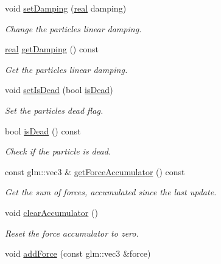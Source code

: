 \begin{DoxyCompactItemize}
void \mbox{\hyperlink{classr3_1_1_particle_a5a7d9ff7821fd5755317ec877f66e8f6}{set\+Damping}} (\mbox{\hyperlink{namespacer3_ab2016b3e3f743fb735afce242f0dc1eb}{real}} damping)
\begin{DoxyCompactList}\small\item\em Change the particle\textquotesingle{}s linear damping. \end{DoxyCompactList}\item 
\mbox{\hyperlink{namespacer3_ab2016b3e3f743fb735afce242f0dc1eb}{real}} \mbox{\hyperlink{classr3_1_1_particle_a5e8544a8ac8e4765a9021f9112209eba}{get\+Damping}} () const
\begin{DoxyCompactList}\small\item\em Get the particle\textquotesingle{}s linear damping. \end{DoxyCompactList}\item 
void \mbox{\hyperlink{classr3_1_1_particle_a1f0b0ac6f094025e02359026c681350f}{set\+Is\+Dead}} (bool \mbox{\hyperlink{classr3_1_1_particle_aeeb9dd636d0851bc007ff718ef9140e9}{is\+Dead}})
\begin{DoxyCompactList}\small\item\em Set the particle\textquotesingle{}s dead flag. \end{DoxyCompactList}\item 
bool \mbox{\hyperlink{classr3_1_1_particle_aeeb9dd636d0851bc007ff718ef9140e9}{is\+Dead}} () const
\begin{DoxyCompactList}\small\item\em Check if the particle is dead. \end{DoxyCompactList}\item 
const glm\+::vec3 \& \mbox{\hyperlink{classr3_1_1_particle_a81fe0cfac976df7da6337dabc8f73313}{get\+Force\+Accumulator}} () const
\begin{DoxyCompactList}\small\item\em Get the sum of forces, accumulated since the last update. \end{DoxyCompactList}\item 
void \mbox{\hyperlink{classr3_1_1_particle_a1ba9a33fb4513cf79eb8bf4954ec6b97}{clear\+Accumulator}} ()
\begin{DoxyCompactList}\small\item\em Reset the force accumulator to zero. \end{DoxyCompactList}\item 
void \mbox{\hyperlink{classr3_1_1_particle_a18bc9d9ded382879086eb2820ce787c9}{add\+Force}} (const glm\+::vec3 \&force)

\end{DoxyCompactItemize}
